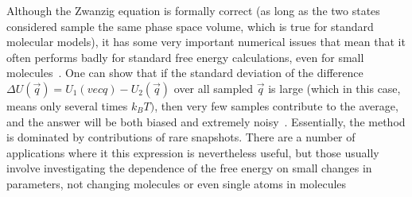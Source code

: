\documentclass[9pt,bestpractices]{livecoms}
\begin{document}
%
Although the Zwanzig equation is formally correct (as long as the two states considered sample the same phase space volume, which is true for standard molecular models), it has some very important numerical issues that mean that it often performs badly for standard free energy calculations, even for small molecules~\cite{shirts2005comparison,lu2003appropriate}.  One can show that if the standard deviation of the difference $\Delta U(\vec{q}) = U_1(vec{q})-U_2(\vec{q})$ over all sampled $\vec{q}$ is large (which in this case, means only several times $k_BT)$, then very few samples contribute to the average, and the answer will be both biased and extremely noisy~\cite{lelievre2010free}. Essentially, the method is dominated by contributions of rare snapshots\cite{jarzynski2006rare, wu2005phasespaceb, wu2005phasespacec}. There are a number of applications where it this expression is nevertheless useful, but those usually involve investigating the dependence of the free energy on small changes in parameters, not changing molecules or even single atoms in molecules~\cite{xx}
%
\end{document}
